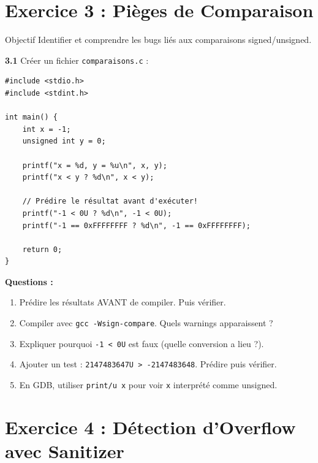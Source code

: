 \documentclass[10pt,a4paper]{article}
\begin{document}
\section{Exercice 3 : Pièges de Comparaison}

\begin{exercicebox}{Objectif}
Identifier et comprendre les bugs liés aux comparaisons signed/unsigned.
\end{exercicebox}

\textbf{3.1} Créer un fichier \texttt{comparaisons.c} :

\begin{lstlisting}
#include <stdio.h>
#include <stdint.h>

int main() {
    int x = -1;
    unsigned int y = 0;
    
    printf("x = %d, y = %u\n", x, y);
    printf("x < y ? %d\n", x < y);
    
    // Prédire le résultat avant d'exécuter!
    printf("-1 < 0U ? %d\n", -1 < 0U);
    printf("-1 == 0xFFFFFFFF ? %d\n", -1 == 0xFFFFFFFF);
    
    return 0;
}
\end{lstlisting}

\textbf{Questions :}
\begin{enumerate}[label=\alph*)]
    \item Prédire les résultats AVANT de compiler. Puis vérifier.
    \item Compiler avec \texttt{gcc -Wsign-compare}. Quels warnings apparaissent ?
    \item Expliquer pourquoi \texttt{-1 < 0U} est faux (quelle conversion a lieu ?).
    \item Ajouter un test : \texttt{2147483647U > -2147483648}. Prédire puis vérifier.
    \item En GDB, utiliser \texttt{print/u x} pour voir \texttt{x} interprété comme unsigned.
\end{enumerate}

\section{Exercice 4 : Détection d'Overflow avec Sanitizer}
\end{document}
